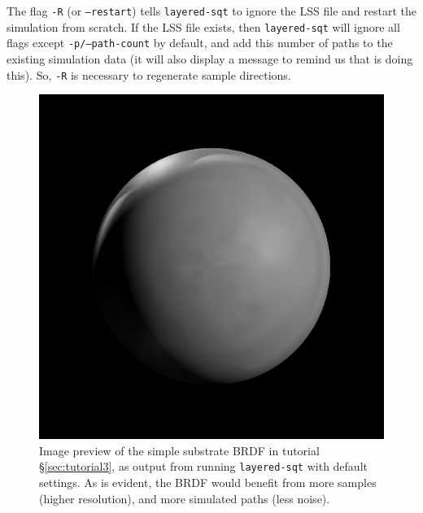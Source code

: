 \documentclass[
    twoside,
    twocolumn,
    letterpaper,
    10pt]{article}
\begin{document}
The flag \texttt{-R} (or \texttt{--restart}) tells \texttt{layered-sqt}
to ignore the LSS file and restart the simulation from scratch. 
If the LSS file exists, then \texttt{layered-sqt} will ignore all flags except 
\texttt{-p/--path-count} by default, and add this number of paths to the existing
simulation data (it will also display a message to remind us that is doing
this). So, \texttt{-R} is necessary to regenerate sample directions. 

\begin{figure}
\begin{center}
    \includegraphics[width=0.75\columnwidth]{tutorial3-1.png}
    \caption{Image preview of the simple substrate BRDF in tutorial 
    \S\ref{sec:tutorial3}, as output from running \texttt{layered-sqt} with
    default settings. As is evident, the BRDF would benefit from more
    samples (higher resolution), and more simulated paths (less noise).
    \label{fig:tutorial3-1}}
\end{center}
\end{figure}
\end{document}
